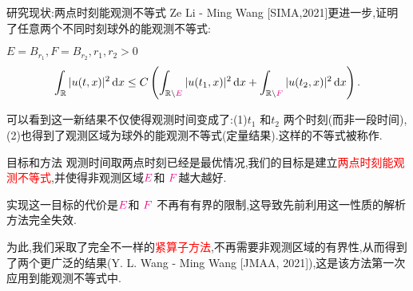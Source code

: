 \begin{frame}{研究现状:两点时刻能观测不等式}
  Ze Li - Ming Wang [SIMA,2021]更进一步,证明了任意两个不同时刻球外的能观测不等式:
  \begin{block}{$E=B_{r_1},F=B_{r_2},r_1,r_2>0$}
    \[
      \int_{\mathbb{R}}|u(t,x)|^2\,\mathrm{d}x\le C \left( \int_{\mathbb{R}\backslash \color{magenta}E}|u(t_1,x)|^2\,\mathrm{d}x+\int_{\mathbb{R} \backslash \color{magenta} F}|u(t_2,x)|^2\,\mathrm{d}x \right). 
    \] 
  \end{block}
  可以看到这一新结果不仅使得观测时间变成了:(1)$t_1$ 和$t_2$ 两个时刻(而非一段时间),(2)也得到了观测区域为球外的能观测不等式(定量结果).这样的不等式被称作\color{red}{两点时刻能观测不等式}.

\end{frame}
\begin{frame}{目标和方法}
  观测时间取两点时刻已经是最优情况,我们的目标是建立\textcolor{red}{两点时刻能观测不等式},并使得非观测区域${\color{magenta}E}$和 ${\color{magenta}{F}}$越大越好.

  实现这一目标的代价是${\color{magenta}E}$和 ${\color{magenta}F}$ 不再有有界的限制,这导致先前利用这一性质的解析方法完全失效.

  为此,我们采取了完全不一样的\textcolor{red}{紧算子方法},不再需要非观测区域的有界性,从而得到了两个更广泛的结果(Y. L. Wang - Ming Wang [JMAA, 2021]),这是该方法第一次应用到能观测不等式中.
\end{frame}
